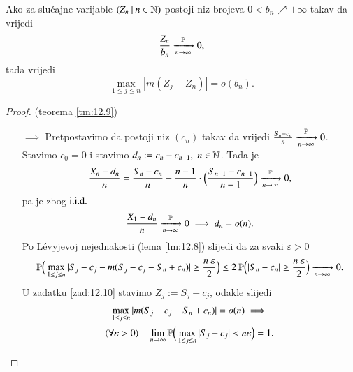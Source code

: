 \begin{zad} \label{zad:12.10}
    Ako za slu\v cajne varijable $({Z_n} \: | \: {n \in \mathbb{N}})$ postoji niz brojeva $0 < b_n \nearrow + \infty$ takav da vrijedi
    \begin{equation*}
        \frac{Z_n}{b_n} \xrightarrow[n \to \infty]{\mathbb{P}} 0,
    \end{equation*}
    tada vrijedi
    \begin{equation*}
        \max\limits_{1 \leq j \leq n} |m(Z_j - Z_n)| = o(b_n).
    \end{equation*}
\end{zad}

\begin{proof}{(teorema \ref{tm:12.9})}
    \begin{itemize}
        \item[$\implies$] Pretpostavimo da postoji niz $(c_n)$ takav da vrijedi $\frac{S_n - c_n}{n} \xrightarrow[n \to \infty]{\mathbb{P}} 0$.
        Stavimo $c_0 = 0$ i stavimo $d_n := c_n - c_{n - 1}, \; n \in \mathbb{N}$.
        Tada je
        \begin{equation*}
            \frac{X_n -d_n}{n} = \frac{S_n - c_n}{n} - \frac{n - 1}{n} \cdot \Big( \frac{S_{n - 1} - c_{n - 1}}{n - 1} \Big) \xrightarrow[n \to \infty]{\mathbb{P}} 0,
        \end{equation*}
        pa je zbog $\mathrm{i.i.d.}$
        \begin{equation*}
            \frac{X_1 - d_n}{n} \xrightarrow[n \to \infty]{\mathbb{P}} 0 \implies d_n = o(n).
        \end{equation*}
        Po L\' evyjevoj nejednakosti (lema \ref{lm:12.8}) slijedi da za svaki $\varepsilon > 0$
        \begin{equation*}
            \mathbb{P} \Big( \max\limits_{1 \leq j \leq n} | S_j - c_j -m( S_j - c_j - S_n + c_n) | \geq \frac{n \: \varepsilon}{2}  \Big)\leq 2 \: \mathbb{P} \Big( |S_n - c_n| \geq \frac{n \: \varepsilon}{2} \Big) \xrightarrow[n \to \infty]{} 0.
        \end{equation*}
        U zadatku \ref{zad:12.10} stavimo $Z_j := S_j - c_j$, odakle slijedi
        \begin{equation*}
            \begin{gathered}
                \max\limits_{1 \leq j \leq n} | m(S_j - c_j - S_n + c_n) | = o(n) \implies\\
                (\forall \varepsilon > 0) \quad \lim\limits_{n \to \infty} \masP \Big( \max\limits_{1 \leq j \leq n} |S_j - c_j | < n \varepsilon \Big) = 1.
            \end{gathered}

\end{equation*}
\end{itemize}
\end{proof}

